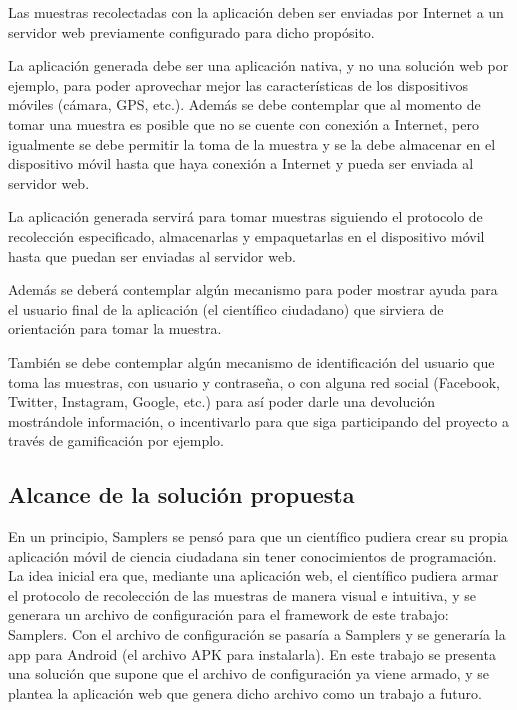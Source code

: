 Las muestras recolectadas con la aplicación deben ser enviadas por Internet a un servidor web previamente configurado para dicho propósito.

La aplicación generada debe ser una aplicación nativa, y no una solución web por ejemplo, para poder aprovechar mejor las características de los dispositivos móviles (cámara, GPS, etc.). Además se debe contemplar que al momento de tomar una muestra es posible que no se cuente con conexión a Internet, pero igualmente se debe permitir la toma de la muestra y se la debe almacenar en el dispositivo móvil hasta que haya conexión a Internet y pueda ser enviada al servidor web.

La aplicación generada servirá para tomar muestras siguiendo el protocolo de recolección especificado, almacenarlas y empaquetarlas en el dispositivo móvil hasta que puedan ser enviadas al servidor web.

Además se deberá contemplar algún mecanismo para poder mostrar ayuda para el usuario final de la aplicación (el científico ciudadano) que sirviera de orientación para tomar la muestra. 

También se debe contemplar algún mecanismo de identificación del usuario que toma las muestras, con usuario y contraseña, o con alguna red social (Facebook, Twitter, Instagram, Google, etc.) para así poder darle una devolución mostrándole información, o incentivarlo para que siga participando del proyecto a través de gamificación por ejemplo.



\subsection{Alcance de la solución propuesta}
En un principio, Samplers se pensó para que un científico pudiera crear su propia aplicación móvil de ciencia ciudadana sin tener conocimientos de programación. 
La idea inicial era que, mediante una aplicación web, el científico pudiera armar el protocolo de recolección de las muestras de manera visual e intuitiva, y se generara un archivo de configuración para el framework de este trabajo: Samplers. 
Con el archivo de configuración se pasaría a Samplers y se generaría la app para Android (el archivo APK para instalarla). 
En este trabajo se presenta una solución que supone que el archivo de configuración ya viene armado, y se plantea la aplicación web que genera dicho archivo como un trabajo a futuro.

